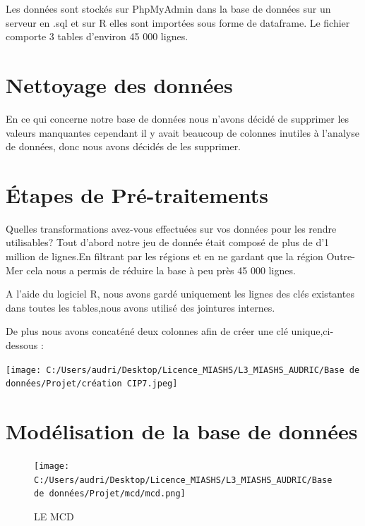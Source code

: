 \documentclass[mstat,12pt]{unswthesis}
\begin{document}
Les données sont stockés sur PhpMyAdmin dans la base de données sur un
serveur en .sql et sur R elles sont importées sous forme de dataframe.
Le fichier comporte 3 tables d'environ 45 000 lignes.

\hypertarget{nettoyage-des-donnuxe9es}{%
\section{Nettoyage des données}\label{nettoyage-des-donnuxe9es}}

En ce qui concerne notre base de données nous n'avons décidé de
supprimer les valeurs manquantes cependant il y avait beaucoup de
colonnes inutiles à l'analyse de données, donc nous avons décidés de les
supprimer.

\hypertarget{uxe9tapes-de-pruxe9-traitements}{%
\section{Étapes de
Pré-traitements}\label{uxe9tapes-de-pruxe9-traitements}}

Quelles transformations avez-vous effectuées sur vos données pour les
rendre utilisables? Tout d'abord notre jeu de donnée était composé de
plus de d'1 million de lignes.En filtrant par les régions et en ne
gardant que la région Outre-Mer cela nous a permis de réduire la base à
peu près 45 000 lignes.

\medskip
\centering

A l'aide du logiciel R, nous avons gardé uniquement les lignes des clés
existantes dans toutes les tables,nous avons utilisé des jointures
internes.

\medskip
\centering

De plus nous avons concaténé deux colonnes afin de créer une clé
unique,ci- dessous :

\medskip

\texttt{[image: C:/Users/audri/Desktop/Licence\_MIASHS/L3\_MIASHS\_AUDRIC/Base de données/Projet/création CIP7.jpeg]}

\hypertarget{moduxe9lisation-de-la-base-de-donnuxe9es}{%
\section{Modélisation de la base de
données}\label{moduxe9lisation-de-la-base-de-donnuxe9es}}

\begin{figure}
\hypertarget{MCD}{%
\centering
\texttt{[image: C:/Users/audri/Desktop/Licence\_MIASHS/L3\_MIASHS\_AUDRIC/Base de données/Projet/mcd/mcd.png]}
\caption{LE MCD}\label{MCD}
}
\end{figure}
\end{document}
